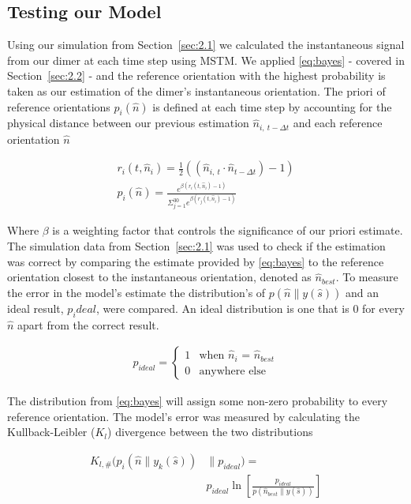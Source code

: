 \documentclass[final, 3p]{elsarticle}
\begin{document}
\subsection{Testing our Model}
\label{sec:2.3}
Using our simulation from Section~\ref{sec:2.1} we calculated the instantaneous signal from our dimer at each time step using MSTM.  We applied \eqref{eq:bayes} - covered in Section~\ref{sec:2.2} - and the reference orientation with the highest probability is taken as our estimation of the dimer's instantaneous orientation. The priori of reference orientations $p_i(\hat{n})$ is defined at each time step by accounting for the physical distance between our previous estimation $\hat{n}_{i, \ t - \Delta t}$ and each reference orientation $\hat{n}$ 

\begin{align}
	r_i(t, \hat{n}_i)= \frac{1}{2}((\hat{n}_{i,\ t} \cdot \hat{n}_{t-\Delta t})-1) \\
	p_i(\hat{n})= \frac{e^{\beta (r_i(t,\hat{n}_i)-1)}}
	{\Sigma_{j=1}^{30}e^{\beta(r_j(t, \hat{n}_i)-1)}}
\end{align}

Where $\beta$ is a weighting factor that controls the significance of our priori estimate. The simulation data from Section~\ref{sec:2.1} was used to check if the estimation was correct by comparing the estimate provided by \eqref{eq:bayes} to the reference orientation closest to the instantaneous orientation, denoted as $\hat{n}_{best}$. To measure the error in the model's estimate the distribution's of $p(\hat{n}\parallel y(\hat{s}))$ and an ideal result, $p_ideal$, were compared. An ideal distribution is one that is 0 for every $\hat{n}$ apart from the correct result. 

\begin{align}
	p_{ideal} = 
	\begin{cases}
		1 & \text{when $\hat{n}_i$ = $\hat{n}_{best}$}\\
		0 & \text{anywhere else}
	\end{cases}
\end{align}

The distribution from \eqref{eq:bayes} will assign some non-zero probability to every reference orientation. The model's error was measured by calculating the Kullback-Leibler ($K_l$) divergence between the two distributions 

\begin{align}
	K_{l, \#}(p_i(\hat{n}\parallel y_k(\hat{s})) &\parallel p_{ideal}) =\nonumber \\
	&p_{ideal}\ln \left[\frac{p_{ideal}}{p(\hat{n}_{best}\parallel y(\hat{s}))}
	\right]
\end{align}
\end{document}
